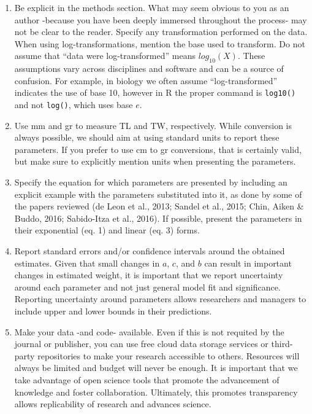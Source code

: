 \documentclass[12pt,]{article}
\begin{document}
\begin{enumerate}
\def\labelenumi{\arabic{enumi}.}
\item
  Be explicit in the methods section. What may seem obvious to you as an
  author -because you have been deeply immersed throughout the process-
  may not be clear to the reader. Specify any transformation performed
  on the data. When using log-transformations, mention the base used to
  transform. Do not assume that ``data were log-transformed'' means
  \(log_{10}(X)\). These assumptions vary across disciplines and
  software and can be a source of confusion. For example, in biology we
  often assume ``log-transformed'' indicates the use of base 10, however
  in R the proper command is \texttt{log10()} and not \texttt{log()},
  which uses base \(e\).
\item
  Use mm and gr to measure TL and TW, respectively. While conversion is
  always possible, we should aim at using standard units to report these
  parameters. If you prefer to use cm to gr conversions, that is
  certainly valid, but make sure to explicitly mention units when
  presenting the parameters.
\item
  Specify the equation for which parameters are presented by including
  an explicit example with the parameters substituted into it, as done
  by some of the papers reviewed (de Leon et al., 2013; Sandel et al.,
  2015; Chin, Aiken \& Buddo, 2016; Sabido-Itza et al., 2016). If
  possible, present the parameters in their exponential (eq. 1) and
  linear (eq. 3) forms.
\item
  Report standard errors and/or confidence intervals around the obtained
  estimates. Given that small changes in \(a\), \(c\), and \(b\) can
  result in important changes in estimated weight, it is important that
  we report uncertainty around each parameter and not just general model
  fit and significance. Reporting uncertainty around parameters allows
  researchers and managers to include upper and lower bounds in their
  predictions.
\item
  Make your data -and code- available. Even if this is not requited by
  the journal or publisher, you can use free cloud data storage services
  or third-party repositories to make your research accessible to
  others. Resources will always be limited and budget will never be
  enough. It is important that we take advantage of open science tools
  that promote the advancement of knowledge and foster collaboration.
  Ultimately, this promotes transparency allows replicability of
  research and advances science.
\end{enumerate}
\end{document}
